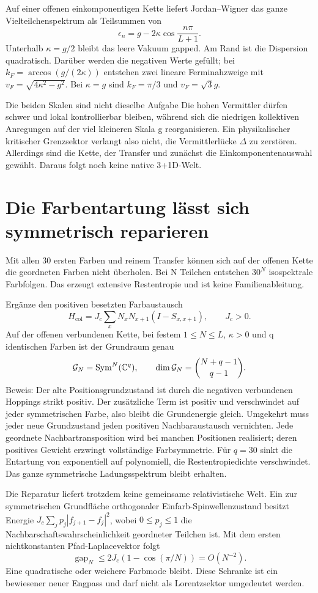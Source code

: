 Auf einer offenen einkomponentigen Kette liefert Jordan--Wigner das ganze Vielteilchenspektrum als Teilsummen von
\[
\epsilon_n=g-2\kappa\cos\frac{n\pi}{L+1}.
\]
Unterhalb $\kappa=g/2$ bleibt das leere Vakuum gapped. Am Rand ist die Dispersion quadratisch. Darüber werden die negativen Werte gefüllt; bei $k_F=\arccos(g/(2\kappa))$ entstehen zwei lineare Ferminahzweige mit $v_F=\sqrt{4\kappa^2-g^2}$. Bei $\kappa=g$ sind $k_F=\pi/3$ und $v_F=\sqrt3g$.

\begin{bild}{Die beiden Skalen sind nicht dieselbe Aufgabe}
Die hohen Vermittler dürfen schwer und lokal kontrollierbar bleiben, während sich die niedrigen kollektiven Anregungen auf der viel kleineren Skala g reorganisieren. Ein physikalischer kritischer Grenzsektor verlangt also nicht, die Vermittlerlücke $\Delta$ zu zerstören. Allerdings sind die Kette, der Transfer und zunächst die Einkomponentenauswahl gewählt. Daraus folgt noch keine native 3+1D-Welt.
\end{bild}

\section{Die Farbentartung lässt sich symmetrisch reparieren}
Mit allen 30 ersten Farben und reinem Transfer können sich auf der offenen Kette die geordneten Farben nicht überholen. Bei N Teilchen entstehen $30^N$ isospektrale Farbfolgen. Das erzeugt extensive Restentropie und ist keine Familienableitung.

Ergänze den positiven besetzten Farbaustausch
\[
H_\mathrm{col}=J_c\sum_xN_xN_{x+1}(I-S_{x,x+1}),\qquad J_c>0.
\]
Auf der offenen verbundenen Kette, bei festem $1\le N\le L$, $\kappa>0$ und q identischen Farben ist der Grundraum genau
\[
\mathcal G_N=\mathrm{Sym}^N(\mathbb C^q),\qquad
\dim\mathcal G_N={N+q-1\choose q-1}.
\]
Beweis: Der alte Positionsgrundzustand ist durch die negativen verbundenen Hoppings strikt positiv. Der zusätzliche Term ist positiv und verschwindet auf jeder symmetrischen Farbe, also bleibt die Grundenergie gleich. Umgekehrt muss jeder neue Grundzustand jeden positiven Nachbaraustausch vernichten. Jede geordnete Nachbartransposition wird bei manchen Positionen realisiert; deren positives Gewicht erzwingt vollständige Farbsymmetrie. Für $q=30$ sinkt die Entartung von exponentiell auf polynomiell, die Restentropiedichte verschwindet. Das ganze symmetrische Ladungsspektrum bleibt erhalten.

Die Reparatur liefert trotzdem keine gemeinsame relativistische Welt. Ein zur symmetrischen Grundfläche orthogonaler Einfarb-Spinwellenzustand besitzt Energie $J_c\sum_jp_j|f_{j+1}-f_j|^2$, wobei $0\le p_j\le1$ die Nachbarschaftswahrscheinlichkeit geordneter Teilchen ist. Mit dem ersten nichtkonstanten Pfad-Laplacevektor folgt
\[
\operatorname{gap}_N\le2J_c(1-\cos(\pi/N))=O(N^{-2}).
\]
Eine quadratische oder weichere Farbmode bleibt. Diese Schranke ist ein bewiesener neuer Engpass und darf nicht als Lorentzsektor umgedeutet werden.

